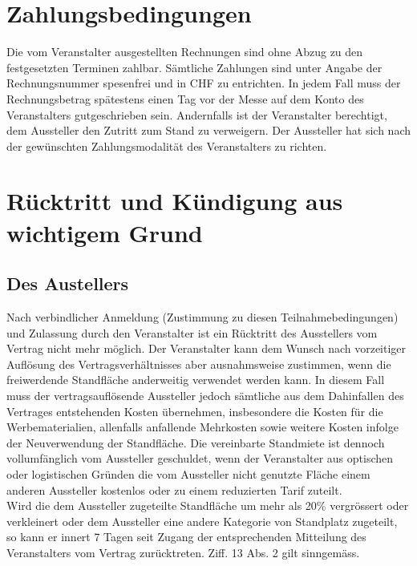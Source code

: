 \documentclass[8pt,a4paper]{article}
\begin{document}
\begin{multicols}{2}
\section{Zahlungsbedingungen}
Die vom Veranstalter ausgestellten Rechnungen sind ohne Abzug zu den festgesetzten Terminen zahlbar. Sämtliche Zahlungen sind unter Angabe der Rechnungsnummer spesenfrei und in CHF zu entrichten. In jedem Fall muss der Rechnungsbetrag spätestens einen Tag vor der Messe auf dem Konto des Veranstalters gutgeschrieben sein. Andernfalls ist der Veranstalter berechtigt, dem Aussteller den Zutritt zum Stand zu verweigern. Der Aussteller hat sich nach der gewünschten Zahlungsmodalität des Veranstalters zu richten. 

\section{Rücktritt und Kündigung aus wichtigem Grund}
\subsection{Des Austellers}
Nach verbindlicher Anmeldung (Zustimmung zu diesen Teilnahmebedingungen) und Zulassung durch den Veranstalter ist ein Rücktritt des Ausstellers vom Vertrag nicht mehr möglich. Der Veranstalter kann dem Wunsch nach vorzeitiger Auflösung des Vertragsverhältnisses aber ausnahmsweise zustimmen, wenn die freiwerdende Standfläche anderweitig verwendet werden kann. In diesem Fall muss der vertragsauflösende Aussteller jedoch sämtliche aus dem Dahinfallen des Vertrages entstehenden Kosten übernehmen, insbesondere die Kosten für die Werbematerialien, allenfalls anfallende Mehrkosten sowie weitere Kosten infolge der Neuverwendung der Standfläche. Die vereinbarte Standmiete ist dennoch vollumfänglich vom Aussteller geschuldet, wenn der Veranstalter aus optischen oder logistischen Gründen die vom Aussteller nicht genutzte Fläche einem anderen Aussteller kostenlos oder zu einem reduzierten Tarif zuteilt. \\
Wird die dem Aussteller zugeteilte Standfläche um mehr als 20\% vergrössert oder verkleinert oder dem Aussteller eine andere Kategorie von Standplatz zugeteilt, so kann er innert 7 Tagen seit Zugang der entsprechenden Mitteilung des Veranstalters vom Vertrag zurücktreten. Ziff. 13 Abs. 2 gilt sinngemäss.


\end{multicols}
\end{document}

